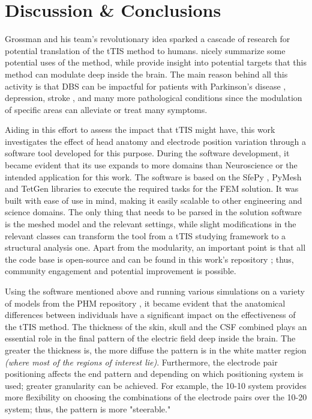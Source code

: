 \pagebreak
\chapter{Discussion \& Conclusions}
\label{sec:discussion}

Grossman and his team's revolutionary idea sparked a cascade of research for potential translation of the \gls{tTIS} method to humans.  nicely summarize some potential uses of the method, while  provide insight into potential targets that this method can modulate deep inside the brain. The main reason behind all this activity is that \gls{DBS} can be impactful for patients with Parkinson's disease \cite{Cagnan2019}, depression, stroke \cite{Bao2020}, and many more \cite{Cagnan2019,Polania2018} pathological conditions since the modulation of specific areas can alleviate or treat many symptoms.

Aiding in this effort to assess the impact that \gls{tTIS} might have, this work investigates the effect of head anatomy and electrode position variation through a software tool developed for this purpose. During the software development, it became evident that its use expands to more domains than Neuroscience or the intended application for this work. The software is based on the SfePy \cite{Cimrman2019}, PyMesh \cite{pymesh} and TetGen \cite{tetgen} libraries to execute the required tasks for the \gls{FEM} solution. It was built with ease of use in mind, making it easily scalable to other engineering and science domains. The only thing that needs to be parsed in the solution software is the meshed model and the relevant settings, while slight modifications in the relevant classes can transform the tool from a \gls{tTIS} studying framework to a structural analysis one. Apart from the modularity, an important point is that all the code base is open-source and can be found in this work's repository \cite{thesis_repo}; thus, community engagement and potential improvement is possible.

Using the software mentioned above and running various simulations on a variety of models from the \gls{PHM} repository \cite{Lee2016,Lee2018,ErikG.Lee2016}, it became evident that the anatomical differences between individuals have a significant impact on the effectiveness of the \gls{tTIS} method. The thickness of the skin, skull and the \gls{CSF} combined plays an essential role in the final pattern of the electric field deep inside the brain. The greater the thickness is, the more diffuse the pattern is in the white matter region \textit{(where most of the regions of interest lie)}. Furthermore, the electrode pair positioning affects the end pattern and depending on which positioning system is used; greater granularity can be achieved. For example, the 10-10 system provides more flexibility on choosing the combinations of the electrode pairs over the 10-20 system; thus, the pattern is more "steerable."

